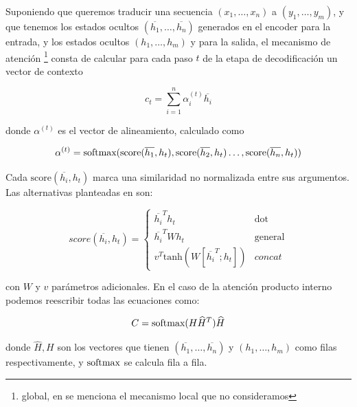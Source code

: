 Suponiendo que queremos traducir una secuencia $(x_1, \ldots , x_n)$ a $(y_1, \ldots , y_m)$, y que tenemos los estados ocultos $(\overline{h_1}, \ldots , \overline{h_n})$ generados en el encoder para la entrada, y los estados ocultos $(h_1, \ldots , h_m)$ y para la salida, el mecanismo de atención \footnote{global, en \citet{luong2015effective} se menciona el mecanismo local que no consideramos} consta de calcular para cada paso $t$ de la etapa de decodificación un vector de contexto

\begin{equation*}
    c_t = \sum_{i=1}^n \alpha_i^{(t)} \overline{h_i}
\end{equation*}

\noindent donde $\alpha^{(t)}$ es el vector de alineamiento, calculado como

\newcommand{\score}[0]{\text{score}}

\begin{equation*}
    \alpha^{(t)} = \softmax(\score(\overline{h_1}, h_t), \score(\overline{h_2}, h_t) \ldots , \score(\overline{h_n}, h_t))
\end{equation*}

\noindent Cada $\score(\overline{h_i}, h_t)$ marca una similaridad no normalizada entre sus argumentos. Las alternativas planteadas en \citet{luong2015effective} son:

\begin{equation}
    score(\overline{h_i}, h_t) =  \begin{cases}
        \overline{h_i}^T h_t   & \text{dot} \\
        \overline{h_i}^T W h_t & \text{general} \\
        v^T\text{tanh}(W [\overline{h_i}^T; h_t]) & concat
     \end{cases}
\end{equation}

%

\noindent con $W$ y $v$ parámetros adicionales. En el caso de la atención producto interno podemos reescribir todas las ecuaciones como:

\begin{equation}
    C = \text{softmax}(H \widehat{H}^T ) \widehat{H}
    \label{eq:attention_product}
\end{equation}

\noindent donde $\widehat{H}, H$ son los vectores que tienen $(\overline{h_1}, \ldots , \overline{h_n})$  y $(h_1, \ldots , h_m)$ como filas respectivamente, y $\text{softmax}$ se calcula fila a fila.

